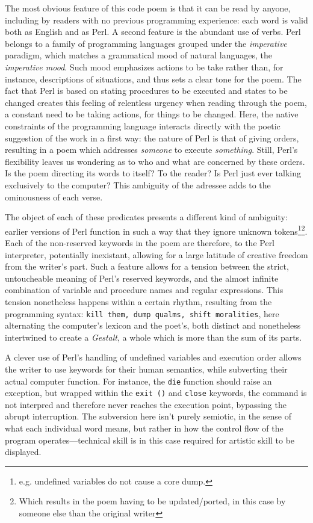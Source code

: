 The most obvious feature of this code poem is that it can be read by anyone, including by readers with no previous programming experience: each word is valid both as English and as Perl. A second feature is the abundant use of verbs. Perl belongs to a family of programming languages grouped under the \emph{imperative} paradigm, which matches a grammatical mood of natural languages, the \emph{imperative mood}. Such mood emphasizes actions to be take rather than, for instance, descriptions of situations, and thus sets a clear tone for the poem. The fact that Perl is based on stating procedures to be executed and states to be changed creates this feeling of relentless urgency when reading through the poem, a constant need to be taking actions, for things to be changed. Here, the native constraints of the programming language interacts directly with the poetic suggestion of the work in a first way: the nature of Perl is that of giving orders, resulting in a poem which addresses \emph{someone} to execute \emph{something}. Still, Perl's flexibility leaves us wondering as to who and what are concerned by these orders. Is the poem directing its words to itself? To the reader? Is Perl just ever talking exclusively to the computer? This ambiguity of the adressee adds to the ominousness of each verse.

The object of each of these predicates presents a different kind of ambiguity: earlier versions of Perl function in such a way that they ignore unknown tokens\footnote{e.g. undefined variables do not cause a core dump.}\footnote{Which results in the poem having to be updated/ported, in this case by someone else than the original writer}. Each of the non-reserved keywords in the poem are therefore, to the Perl interpreter, potentially inexistant, allowing for a large latitude of creative freedom from the writer's part. Such a feature allows for a tension between the strict, untoucheable meaning of Perl's reserved keywords, and the almost infinite combination of variable and procedure names and regular expressions. This tension nonetheless happens within a certain rhythm, resulting from the programming syntax: \lstinline{kill them, dump qualms, shift moralities}, here alternating the computer's lexicon and the poet's, both distinct and nonetheless intertwined to create a \emph{Gestalt}, a whole which is more than the sum of its parts.

A clever use of Perl's handling of undefined variables and execution order allows the writer to use keywords for their human semantics, while subverting their actual computer function. For instance, the \lstinline{die} function should raise an exception, but wrapped within the \lstinline{exit ()} and \lstinline{close} keywords, the command is not interpred and therefore never reaches the execution point, bypassing the abrupt interruption. The subversion here isn't purely semiotic, in the sense of what each individual word means, but rather in how the control flow of the program operates—technical skill is in this case required for artistic skill to be displayed.

